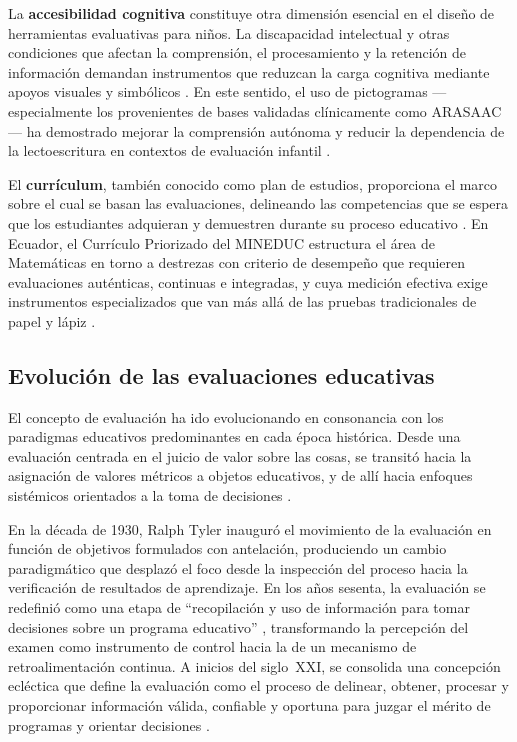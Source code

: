 La \textbf{accesibilidad cognitiva} constituye otra dimensión esencial en el diseño de herramientas evaluativas para niños. La discapacidad intelectual y otras condiciones que afectan la comprensión, el procesamiento y la retención de información demandan instrumentos que reduzcan la carga cognitiva mediante apoyos visuales y simbólicos \cite{mayer2014multimedia,guillomia2021cognitive}. En este sentido, el uso de pictogramas —especialmente los provenientes de bases validadas clínicamente como ARASAAC— ha demostrado mejorar la comprensión autónoma y reducir la dependencia de la lectoescritura en contextos de evaluación infantil \cite{guillomia2021cognitive}.

El \textbf{currículum}, también conocido como plan de estudios, proporciona el marco sobre el cual se basan las evaluaciones, delineando las competencias que se espera que los estudiantes adquieran y demuestren durante su proceso educativo \cite{mineduc2021curriculo}. En Ecuador, el Currículo Priorizado del MINEDUC estructura el área de Matemáticas en torno a destrezas con criterio de desempeño que requieren evaluaciones auténticas, continuas e integradas, y cuya medición efectiva exige instrumentos especializados que van más allá de las pruebas tradicionales de papel y lápiz \cite{velezvelez2024curriculo,velezvelez2024curriculo}.

\subsection{Evolución de las evaluaciones educativas}

El concepto de evaluación ha ido evolucionando en consonancia con los paradigmas educativos predominantes en cada época histórica. Desde una evaluación centrada en el juicio de valor sobre las cosas, se transitó hacia la asignación de valores métricos a objetos educativos, y de allí hacia enfoques sistémicos orientados a la toma de decisiones \cite{maskos2025fa}.

En la década de 1930, Ralph Tyler inauguró el movimiento de la evaluación en función de objetivos formulados con antelación, produciendo un cambio paradigmático que desplazó el foco desde la inspección del proceso hacia la verificación de resultados de aprendizaje. En los años sesenta, la evaluación se redefinió como una etapa de ``recopilación y uso de información para tomar decisiones sobre un programa educativo'' \cite{black1998inside}, transformando la percepción del examen como instrumento de control hacia la de un mecanismo de retroalimentación continua. A inicios del siglo~XXI, se consolida una concepción ecléctica que define la evaluación como el proceso de delinear, obtener, procesar y proporcionar información válida, confiable y oportuna para juzgar el mérito de programas y orientar decisiones \cite{maskos2025fa}.


